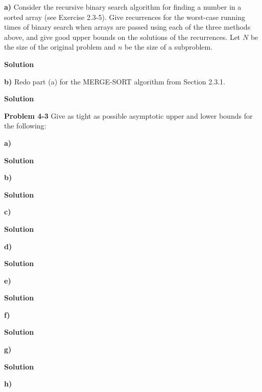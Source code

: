 \documentclass{article}
\begin{document}
\textbf{a)} Consider the recursive binary search algorithm for finding a number in a sorted array (see Exercise 2.3-5). Give recurrences for the worst-case running times of binary search when arrays are passed using each of the three methods above, and give good upper bounds on the solutions of the recurrences. Let $N$ be the size of the original problem and $n$ be the size of a subproblem.

\medskip

\textbf{Solution}

\medskip

\textbf{b)} Redo part (a) for the MERGE-SORT algorithm from Section 2.3.1.

\medskip

\textbf{Solution}

\hrulefill

\medskip

\textbf{Problem 4-3} Give as tight as possible asymptotic upper and lower bounds for the following:

\medskip

\textbf{a)}

\medskip

\textbf{Solution}

\medskip

\textbf{b)}

\medskip

\textbf{Solution}

\medskip

\textbf{c)}

\medskip

\textbf{Solution}

\medskip

\textbf{d)}

\medskip

\textbf{Solution}

\medskip

\textbf{e)}

\medskip

\textbf{Solution}

\medskip

\textbf{f)}

\medskip

\textbf{Solution}

\medskip

\textbf{g)}

\medskip

\textbf{Solution}

\medskip

\textbf{h)}
\end{document}
